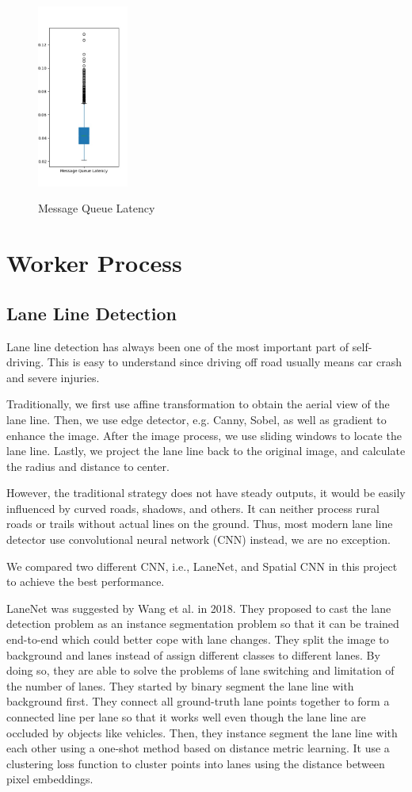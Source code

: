 \documentclass[runningheads]{llncs}
\begin{document}
\begin{figure}
    \centering
    \includegraphics[height=6cm]{reference/latency}
    \label{fig:MQLatency}
    \caption{Message Queue Latency}
\end{figure}


\section{Worker Process}

\subsection{Lane Line Detection}
Lane line detection has always been one of the most 
important part of self-driving. This is easy to understand 
since driving off road usually means car crash and severe 
injuries. 

Traditionally, we first use affine transformation to obtain 
the aerial view of the lane line. Then, we use edge 
detector, e.g. Canny, Sobel, as well as gradient to enhance 
the image. After the image process, we use sliding windows 
to locate the lane line. Lastly, we project the lane line 
back to the original image, and calculate the radius and 
distance to center. 

However, the traditional strategy does not have steady 
outputs, it would be easily influenced by curved roads, 
shadows, and others. It can neither process rural roads or 
trails without actual lines on the ground. Thus, most 
modern lane line detector use convolutional neural network 
(CNN) instead, we are no exception. 

We compared two different CNN, i.e., LaneNet, and 
Spatial CNN in this project to achieve the best performance. 

LaneNet was suggested by Wang et al.\cite{LaneNet} in 2018. 
They proposed to cast the lane detection problem as an 
instance segmentation problem so that it can be trained 
end-to-end which could better cope with lane changes. 
They split the image to background and lanes instead of 
assign different classes to different lanes. By doing so, 
they are able to solve the problems of lane switching and 
limitation of the number of lanes. They started by binary 
segment the lane line with background first. They connect 
all ground-truth lane points together to form a connected 
line per lane so that it works well even though the lane 
line are occluded by objects like vehicles. Then, they 
instance segment the lane line with each other using a 
one-shot method based on distance metric learning. It use a 
clustering loss function to cluster points into lanes using 
the distance between pixel embeddings.
 
\end{document}
